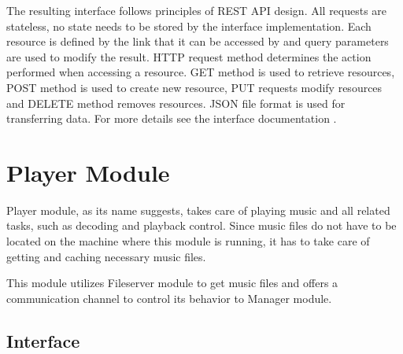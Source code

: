 \par
The resulting interface follows principles of REST API design. All requests are stateless, no state needs to be stored by the interface implementation. Each resource is defined by the link that it can be accessed by and query parameters are used to modify the result. HTTP request method determines the action performed when accessing a resource. GET method is used to retrieve resources, POST method is used to create new resource, PUT requests modify resources and DELETE method removes resources. JSON file format is used for transferring data. For more details see the interface documentation .

\section {Player Module}

Player module, as its name suggests, takes care of playing music and all related tasks, such as decoding and playback control. Since music files do not have to be located on the machine where this module is running, it has to take care of getting and caching necessary music files.
\par
This module utilizes Fileserver module to get music files and offers a communication channel to control its behavior to Manager module.

\subsection{Interface}

